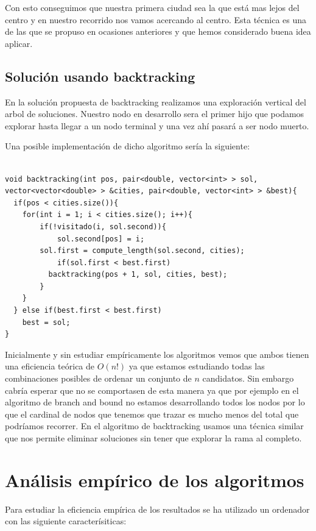 \documentclass{article}
\begin{document}
Con esto conseguimos que nuestra primera ciudad sea la que está mas
lejos del centro y en nuestro recorrido nos vamos acercando al
centro. Esta técnica es una de las que se propuso en ocasiones
anteriores y que hemos considerado buena idea aplicar.

\subsection{Solución usando backtracking}

En la solución propuesta de backtracking realizamos una exploración
vertical del arbol de soluciones. Nuestro nodo en desarrollo sera el
primer hijo que podamos explorar hasta llegar a un nodo terminal y una
vez ahí pasará a ser nodo muerto.

Una posible implementación de dicho algoritmo sería la siguiente:

\begin{lstlisting}
  
void backtracking(int pos, pair<double, vector<int> > sol, vector<vector<double> > &cities, pair<double, vector<int> > &best){
  if(pos < cities.size()){
    for(int i = 1; i < cities.size(); i++){
  		if(!visitado(i, sol.second)){
  			sol.second[pos] = i;
        sol.first = compute_length(sol.second, cities);
  			if(sol.first < best.first)
          backtracking(pos + 1, sol, cities, best);
    	}
    }
  } else if(best.first < best.first)
    best = sol;
}

\end{lstlisting}

Inicialmente y sin estudiar empíricamente los algoritmos vemos que
ambos tienen una eficiencia teórica de $O(n!)$ ya que estamos
estudiando todas las combinaciones posibles de ordenar un conjunto de
$n$ candidatos. Sin embargo cabría esperar que no se comportasen de
esta manera ya que por ejemplo en el algoritmo de branch and bound no
estamos desarrollando todos los nodos por lo que el cardinal de nodos
que tenemos que trazar es mucho menos del total que podríamos
recorrer. En el algoritmo de backtracking usamos una técnica similar
que nos permite eliminar soluciones sin tener que explorar la rama al
completo.

\section{Análisis empírico de los algoritmos}

Para estudiar la eficiencia empírica de los resultados se ha utilizado
un ordenador con las siguiente caracterísiticas:
\end{document}

